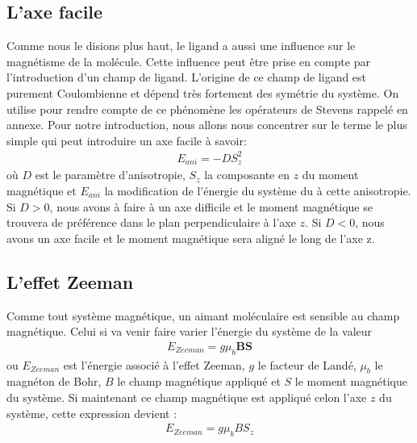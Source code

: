 \subsection{L'axe facile}
Comme nous le disions plus haut, le ligand a aussi une influence sur le magnétisme de la molécule. Cette influence peut \^etre prise en compte par l'introduction d'un champ de ligand. L'origine de ce champ de ligand est purement Coulombienne
 et dépend très fortement des symétrie du système. On utilise pour rendre compte de ce phénomène les opérateurs de Stevens rappelé en annexe. Pour notre introduction, nous allons nous concentrer sur le terme le plus simple qui peut introduire un axe facile à savoir:
 \begin{eqnarray}
E_{ani} = -DS_z^2 \nonumber
\end{eqnarray}
où $D$ est le paramètre d'anisotropie, $S_z$ la composante en $z$ du moment magnétique et $E_{ani}$ la modification de l'énergie du système du à cette anisotropie. Si $D>0$, nous avons à faire à un axe difficile et le moment magnétique se trouvera de préférence dans le plan perpendiculaire à l'axe $z$. Si $D<0$, nous avons un axe facile et le moment magnétique sera aligné le long de l'axe z.

\subsection{L'effet Zeeman}
Comme tout système magnétique, un aimant moléculaire est sensible au champ magnétique. Celui si va venir faire varier l'énergie du système de la valeur
\begin{eqnarray}
E_{Zeeman}= g\mu_b \mathbf{BS} \nonumber
\end{eqnarray}
ou $E_{Zeeman}$ est l'énergie associé à l'effet Zeeman, $g$ le facteur de Landé, $\mu_b$ le magnéton de Bohr, $B$ le champ magnétique appliqué et $S$ le moment magnétique du système. Si maintenant ce champ magnétique est appliqué celon l'axe $z$ du système, cette expression devient :
\begin{eqnarray}
E_{Zeeman}= g\mu_b B S_z \nonumber
\end{eqnarray}

